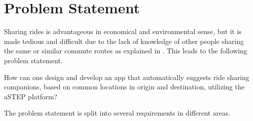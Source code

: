 \section{Problem Statement}
Sharing rides is advantageous in economical and environmental sense, but it is made tedious and   difficult due to the lack of knowledge of other people sharing the same or similar commute routes as explained in \cite{doi:10.1080/01441647.2011.621557}. This leads to the following problem statement.

{\addtolength{\leftskip}{10mm}\addtolength{\rightskip}{10mm}\noindent\hrulefill\it

\noindent How can one design and develop an app that automatically suggests ride sharing companions, based on common locations in origin and destination, utilizing the aSTEP platform? 

\noindent\hrulefill

}

The problem statement is split into several requirements in different areas.